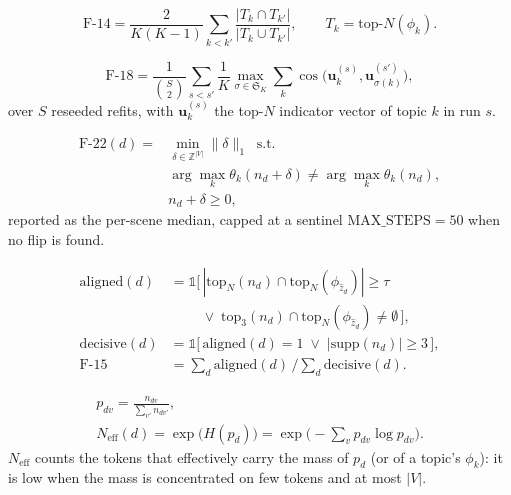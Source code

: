 \begin{equation}\label{eq:f14}
\mathrm{F\text{-}14}=\frac{2}{K(K-1)}\sum_{k<k'}
\frac{|T_k\cap T_{k'}|}{|T_k\cup T_{k'}|},\qquad T_k=\text{top-}N(\phi_k).
\end{equation}

\begin{equation}\label{eq:f18}
\mathrm{F\text{-}18}=\frac{1}{\binom{S}{2}}\sum_{s<s'}\frac{1}{K}
\max_{\sigma\in\mathfrak{S}_K}\sum_{k}\cos\!\big(\mathbf{u}^{(s)}_k,\mathbf{u}^{(s')}_{\sigma(k)}\big),
\end{equation}
over $S$ reseeded refits, with $\mathbf{u}^{(s)}_k$ the top-$N$ indicator
vector of topic $k$ in run $s$.

\begin{equation}\label{eq:f22}
\begin{aligned}
\mathrm{F\text{-}22}(d)={}&\min_{\delta\in\mathbb{Z}^{|V|}}\lVert\delta\rVert_1
\;\;\text{s.t.}\\
&\arg\max_k\theta_k(n_d+\delta)\neq\arg\max_k\theta_k(n_d),\\
&n_d+\delta\ge 0,
\end{aligned}
\end{equation}
reported as the per-scene median, capped at a sentinel
$\mathrm{MAX\_STEPS}=50$ when no flip is found.

\begin{equation}\label{eq:f15}
\begin{aligned}
\mathrm{aligned}(d)&=\mathds{1}\big[\,|\mathrm{top}_N(n_d)\cap\mathrm{top}_N(\phi_{\hat{z}_d})|\ge\tau\\
&\qquad\;\vee\;\mathrm{top}_3(n_d)\cap\mathrm{top}_N(\phi_{\hat{z}_d})\neq\emptyset\,\big],\\
\mathrm{decisive}(d)&=\mathds{1}\big[\,\mathrm{aligned}(d)=1\;\vee\;|\mathrm{supp}(n_d)|\ge 3\,\big],\\
\mathrm{F\text{-}15}&=\textstyle\sum_d \mathrm{aligned}(d)\,\big/\textstyle\sum_d \mathrm{decisive}(d).
\end{aligned}
\end{equation}

\begin{equation}\label{eq:dispersion}
\begin{gathered}
p_{dv}=\frac{n_{dv}}{\sum_{v'} n_{dv'}},\\
N_{\mathrm{eff}}(d)=\exp\!\big(H(p_d)\big)=\exp\!\Big(-\sum_v p_{dv}\log p_{dv}\Big).
\end{gathered}
\end{equation}
$N_{\mathrm{eff}}$ counts the tokens that effectively carry the mass of
$p_d$ (or of a topic's $\phi_k$): it is low when the mass is concentrated
on few tokens and at most $|V|$.


